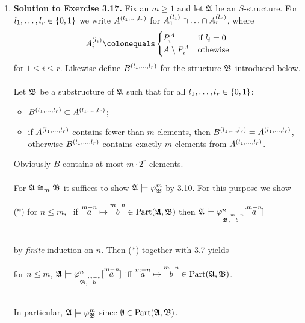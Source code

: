 \begin{enumerate}[1.]
\begin{enumerate}[(a)]
\begin{remark}
\end{remark}
\end{enumerate}
%
\item \textbf{Solution to Exercise 3.17.} Fix an $m \geq 1$ and let $\struct{A}$ be an $S$-structure. For $\seq[1]{l}{r} \in \{ 0, 1 \}$ we write $A^{\tuple{\seq[1]{l}{r}}}$ for $\enumpop{A_1^{(l_1)}}{\cap}{A_r^{(l_r)}}$, where
\[
A_i^{(l_i)} \colonequals \begin{cases}
P^A_i             & \mbox{if \(l_i = 0\)} \cr
A \setminus P^A_i & \mbox{othewise}
\end{cases}
\]
for $1 \leq i \leq r$. Likewise define $B^{\tuple{\seq[1]{l}{r}}}$ for the structure $\struct{B}$ introduced below.\\
\ \\
Let $\struct{B}$ be a substructure of $\struct{A}$ such that for all $\seq[1]{l}{r} \in \{ 0, 1 \}$:
\begin{itemize}
\item $B^{\tuple{\seq[1]{l}{r}}} \subset A^{\tuple{\seq[1]{l}{r}}}$;
\item if $A^{\tuple{\seq[1]{l}{r}}}$ contains fewer than $m$ elements, then $B^{\tuple{\seq[1]{l}{r}}} = A^{\tuple{\seq[1]{l}{r}}}$, otherwise $B^{\tuple{\seq[1]{l}{r}}}$ contains exactly $m$ elements from $A^{\tuple{\seq[1]{l}{r}}}$.
\end{itemize}
Obviously $B$ contains at most $m \cdot 2^r$ elements.\\
\ \\
For $\struct{A} \iso_m \struct{B}$ it suffices to show $\struct{A} \models \varphi^m_\struct{B}$ by 3.10. For this purpose we show\smallskip\\
\begin{quoteno}{($\ast$)}
for $n \leq m$, \ if $\vect{a}{m - n} \mapsto \vect{b}{m - n} \in \partism{\struct{A}}{\struct{B}}$ then $\struct{A} \models \varphi^n_{\struct{B}, \vect{b}{m - n}}[\vect{a}{m - n}]$
\end{quoteno}\smallskip\\
by \emph{finite} induction on $n$. Then ($\ast$) together with 3.7 yields\\
\centerline{for $n \leq m$, \quad $\struct{A} \models \varphi^n_{\struct{B}, \vect{b}{m - n}}[\vect{a}{m - n}]$ \quad iff \quad $\vect{a}{m - n} \mapsto \vect{b}{m - n} \in \partism{\struct{A}}{\struct{B}}$.}\\
In particular, $\struct{A} \models \varphi^m_\struct{B}$ since $\emptyset \in \partism{\struct{A}}{\struct{B}}$.\medskip\\

\end{enumerate}
